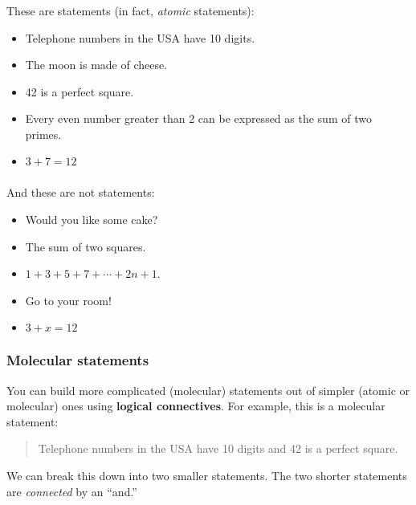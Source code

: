 \documentclass[11pt, compress]{beamer}
\newcommand{\terminology}[1]{\textbf{#1}}
\begin{document}
\begin{frame}
\frametitle{}
\begin{example}[0.2.1]These are statements (in fact, \emph{atomic} statements):\begin{itemize}
\item{} Telephone numbers in the USA have 10 digits.


\item{} The moon is made of cheese.


\item{} 42 is a perfect square.


\item{} Every even number greater than 2 can be expressed as the sum of two primes.


\item{} \(3+7 = 12\)

\end{itemize}

\end{example}
\end{frame}
 
\begin{frame}
\frametitle{}
\begin{example}[0.2.1]And these are not statements:\begin{itemize}
\item{} Would you like some cake?


\item{} The sum of two squares.


\item{} \(1+3+5+7+\cdots+2n+1\).

\item{} Go to your room!


\item{} \(3+x = 12\)

\end{itemize}

\end{example}
\end{frame}
 
\begin{frame}
\frametitle{Molecular statements}
 You can build more complicated (molecular) statements out of simpler (atomic or molecular) ones using \terminology{logical connectives}. For example, this is a molecular statement:
 \begin{quote}%
Telephone numbers in the USA have 10 digits and 42 is a perfect square.
\end{quote}
 
\pause \vfill 

We can break this down into two smaller statements. The two shorter statements are \emph{connected} by an ``and.''
\end{frame}
 
\end{document}

